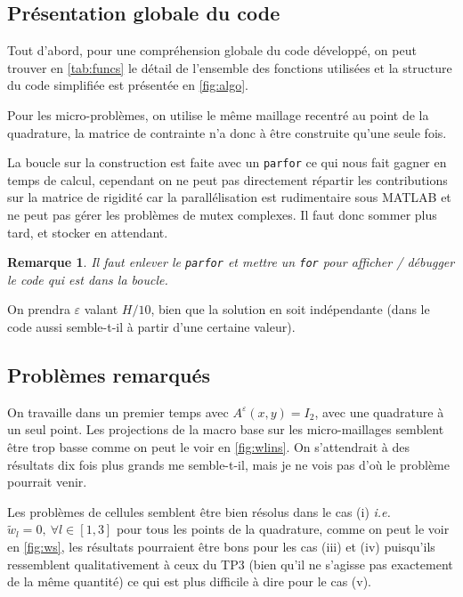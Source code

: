 \documentclass[11pt]{article}
\newtheorem{rmq}{Remarque}
\newcommand{\tw}{\tilde{w}}
\newcommand{\Ae}{A^\varepsilon}
\newcommand{\ie}{\emph{i.e.{}}~}
\begin{document}
\subsection{Présentation globale du code}

Tout d'abord, pour une compréhension globale du code développé, on peut trouver en \autoref{tab:funcs} le détail de l'ensemble des fonctions utilisées
et la structure du code simplifiée est présentée en \autoref{fig:algo}.

Pour les micro-problèmes, on utilise le même maillage recentré au point de la quadrature, la matrice de contrainte n'a donc à être construite qu'une
seule fois.

La boucle sur la construction est faite avec un \texttt{parfor} ce qui nous fait gagner en temps de calcul, cependant on ne peut pas directement
répartir les contributions sur la matrice de rigidité car la parallélisation est rudimentaire sous MATLAB et ne peut pas gérer les problèmes de mutex
complexes. Il faut donc sommer plus tard, et stocker en attendant.
\begin{rmq}
  Il faut enlever le \texttt{parfor} et mettre un \texttt{for} pour afficher / débugger le code qui est dans la boucle. 
\end{rmq}

On prendra $\varepsilon$ valant $H/10$, bien que la solution en soit indépendante (dans le code aussi semble-t-il à partir d'une certaine valeur). 

\subsection{Problèmes remarqués}

On travaille dans un premier temps avec $\Ae(x, y) = I_2$, avec une quadrature à un seul point. Les projections de la macro base sur les
micro-maillages semblent être trop basse comme on peut le voir en \autoref{fig:wlins}. On s'attendrait à des résultats dix fois plus grands me
semble-t-il, mais je ne vois pas d'où le problème pourrait venir.


Les problèmes de cellules semblent être bien résolus dans le cas (i) \ie $\tw_l=0,~\forall l \in [1, 3]$ pour tous les points de la quadrature, comme on peut le voir en
\autoref{fig:ws}, les résultats pourraient être bons pour les cas (iii) et (iv) puisqu'ils ressemblent qualitativement à ceux du TP3 (bien qu'il ne s'agisse
pas exactement de la même quantité) ce qui est plus difficile à dire pour le cas (v).
\end{document}
